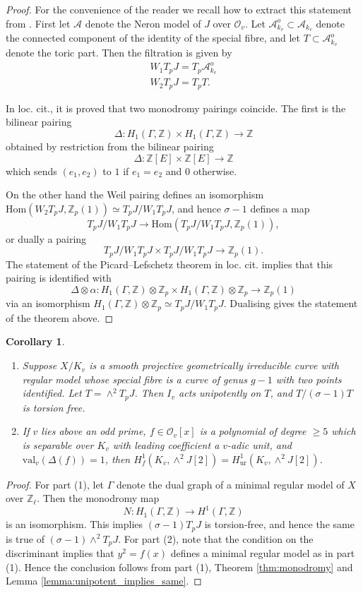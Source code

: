 \documentclass[11pt]{amsart}
\def\Z{\mathbb Z}
\theoremstyle{plain}
\newtheorem{corollary}{Corollary}
\theoremstyle{definition}
\newcommand{\ur}{\mathrm{ur}}
\newcommand{\val}{\mathrm{val}}
\newcommand{\Hom}{\mathrm{Hom}}
\begin{document}
\begin{proof}
For the convenience of the reader we recall how to extract this statement from \cite[Expos\'e VIII Theorem 12.5]{SGA7}. First let $\mathcal{A}$ denote the Neron model of $J$ over $\mathcal{O}_v$. Let $\mathcal{A}^o _{k_v} \subset \mathcal{A}_{k_v} $ denote the connected component of the identity of the special fibre, and let $T\subset \mathcal{A}^o _{k_v}$ denote the toric part. Then the filtration is given by 
\begin{align*}
W_1 T_p J=T_p \mathcal{A}^o _{k_v} \\
W_2 T_p J=T_p T.
\end{align*}


In loc. cit., it is proved that two monodromy pairings coincide. The first is the bilinear pairing \cite[12.4.5]{SGA7}
\[
\Delta : H_1 (\Gamma ,\Z )\times H_1 (\Gamma , \Z )\to \Z 
\]
obtained by restriction from the bilinear pairing
\[
\Delta :\Z [E]\times \Z [E] \to \Z
\]
which sends $(e_1 ,e_2 )$ to $1$ if $e_1 =e_2 $ and $0$ otherwise.

On the other hand the Weil pairing defines an isomorphism $\Hom (W_2 T_p J ,\Z _p (1))\simeq T_p J/W_1 T_p J$, and hence $\sigma -1$ defines a map
\[
T_p J/W_1 T_p J\to \Hom (T_p J/W_1 T_p J ,\Z _p (1)),
\]
or dually a pairing 
\[
T_p J/W_1 T_p J \times T_p J/W_1 T_p J \to \Z _p (1).
\]
The statement of the Picard--Lefschetz theorem in loc. cit. implies that this pairing is identified with
\[
\Delta \otimes \alpha :H_1 (\Gamma ,\Z )\otimes \Z _p \times H_1 (\Gamma ,\Z )\otimes \Z _p \to \Z _p (1)
\]
via an isomorphism $H_1 (\Gamma ,\Z )\otimes \Z _p \simeq T_p J/W_1 T_p J$. Dualising gives the statement of the theorem above.
\end{proof}

\begin{corollary}
\begin{enumerate}
\item Suppose $X/K_v $ is a smooth projective geometrically irreducible curve with regular model whose special fibre is a curve of genus $g-1$ with two points identified. Let $T=\wedge ^2 T_p J$. Then $I_v$ acts unipotently on $T$, and $T/(\sigma -1)T$ is torsion free.
\item If $v$ lies above an odd prime, $f\in \mathcal{O}_v [x]$ is a polynomial of degree $\geq 5$ which is separable over $K_v$ with leading coefficient a $v$-adic unit, and $\val _v (\Delta (f))=1$, then $H^1 _f (K_v ,\wedge ^2 J[2])=H^1 _{\ur }(K_v ,\wedge ^2 J[2])$.
\end{enumerate}
\end{corollary}
\begin{proof}
For part (1), let $\Gamma $ denote the dual graph of a minimal regular model of $X$ over $\Z _{\ell }$. Then the monodromy map
\[
N:H_1 (\Gamma ,\Z  )\to H^1 (\Gamma ,\Z  )
\]
is an isomorphism. This implies $(\sigma -1)T_p J$ is torsion-free, and hence the same is true of $(\sigma -1)\wedge ^2 T_p J$. For part (2), note that the condition on the discriminant implies that $y^2 =f(x)$ defines a minimal regular model as in part (1). Hence the conclusion follows from part (1), Theorem \ref{thm:monodromy} and Lemma \ref{lemma:unipotent_implies_same}.
\end{proof}
\end{document}
